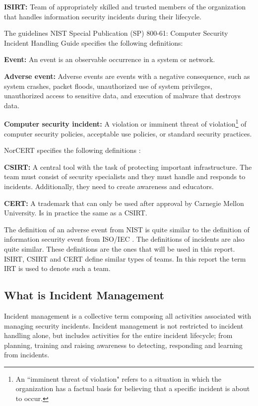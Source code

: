 \textbf{\ac{ISIRT}:} Team of appropriately skilled and trusted members of the organization that handles information security incidents during their lifecycle.

The guidelines \acs{NIST} Special Publication (SP) 800-61: Computer Security Incident Handling
Guide \cite{nist800-61} specifies the following definitions:

\textbf{Event:} An event is an observable occurrence in a system or network.

\textbf{Adverse event:} Adverse events are events with a negative consequence, such as system crashes, packet floods, unauthorized use of system privileges, unauthorized access to sensitive data, and execution of malware that destroys data.

\textbf{Computer security incident:} A violation or imminent threat of violation\footnote{An ``imminent threat of violation" refers to a situation in which the organization has a factual basis for believing that a specific incident is about to occur.} of computer security policies, acceptable use policies, or standard security practices.

\acs{NorCERT} specifies the following definitions \cite{NorCERT3Kvartal2012}:

\textbf{\ac{CSIRT}:} A central tool with the task of protecting important infrastructure. The team must consist of security specialists and they must handle and responds to incidents. Additionally, they need to create awareness and educators.

\textbf{\ac{CERT}:} A trademark that can only be used after approval by Carnegie Mellon University. Is in practice the same as a \acs{CSIRT}.

The definition of an adverse event from \acs{NIST} \cite{nist800-61} is quite similar to the definition of information security event from ISO/IEC \cite{ISO/IEC27000}. The definitions of incidents are also quite similar. These definitions are the ones that will be used in this report. \ac{ISIRT}, \ac{CSIRT} and \ac{CERT} define similar types of teams. In this report the term \acs{IRT} is used to denote such a team. 

\subsection{What is Incident Management}
Incident management is a collective term composing all activities associated with managing security incidents. Incident management is not restricted to incident handling alone, but includes activities for the entire incident lifecycle; from planning, training and raising awareness to detecting, responding and learning from incidents. 

